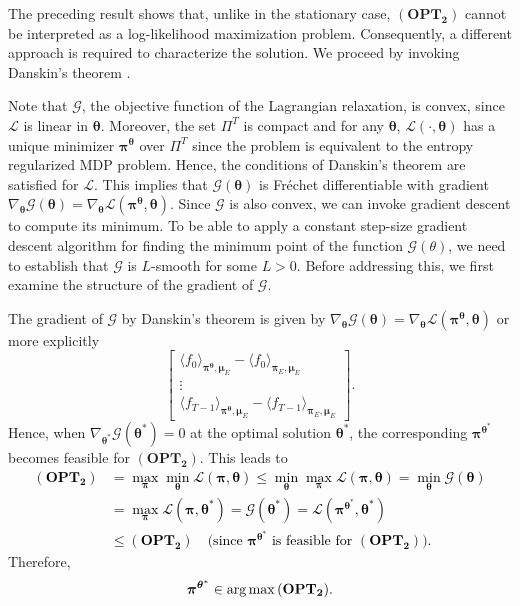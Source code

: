\documentclass[11pt]{article}
\newcommand{\argmax}{\mathop{\rm arg\, max}}
\newcommand{\bmu}{{\boldsymbol \mu}}
\newcommand{\bpi}{{\boldsymbol \pi}}
\newcommand{\btheta}{{\boldsymbol \theta}}
\newcommand{\cL}{{\mathcal L}}
\newcommand{\cG}{{\mathcal G}}
\newcommand{\lk}[1]{\textcolor{black}{#1}} %
\begin{document}
The preceding result shows that, unlike in the stationary case, $\mathbf{(OPT_2)}$ cannot be interpreted as a log-likelihood maximization problem. Consequently, a different approach is required to characterize the solution. We proceed by invoking Danskin's theorem \cite[Proposition B.25]{Ber99}.




Note that $\cG$, the objective function of the Lagrangian relaxation, is convex, since $\cL$ is linear in $\btheta$. Moreover, the set $\Pi^T$ is compact and for any $\btheta$, $\cL(\cdot,\btheta)$ has a unique minimizer $\bpi^{\btheta}$ over $\Pi^T$ since the problem is equivalent to the entropy regularized MDP problem. Hence,  the conditions of Danskin's theorem \cite[Proposition B.25]{Ber99}  are satisfied for $\cL$. This implies that $\cG(\btheta)$ is Fr\'echet differentiable with gradient $\nabla_{\btheta} \cG(\btheta) = \nabla_{\btheta} \cL(\bpi^{\btheta},\btheta)$. Since $\cG$ is also convex, we can invoke gradient descent to compute its minimum.
To be able to apply a constant step-size gradient descent algorithm for finding the minimum point of the function $\cG(\theta)$, we need to establish that $\cG$ is $L$-smooth for some $L>0$. Before addressing this, we first examine the structure of the gradient of $\cG$.

The gradient of $\cG$ by Danskin's theorem is given by $\nabla_{\btheta} \cG(\btheta) = \nabla_{\btheta} \cL(\bpi^{\btheta},\btheta)$ or more explicitly
$$
\begin{bmatrix} \langle f_0 \rangle_{\bpi^{\btheta},\bmu_E} - \langle f_0 \rangle_{\bpi_E,\bmu_E} \\ \vdots \\ \langle f_{T-1} \rangle_{\bpi^{\btheta},\bmu_E} - \langle f_{T-1} \rangle_{\bpi_E,\bmu_E} \end{bmatrix}.
$$
Hence, when $\nabla_{\btheta^*} \cG(\btheta^*) = 0$ at the optimal solution $\btheta^*$, the corresponding $\bpi^{\btheta^*}$ becomes feasible for ${\mathbf{(OPT_2)}}$. This leads to
\lk{\begin{align*}
\mathbf{(OPT_2)} &= \max_{\bpi} \min_{\btheta} \cL(\bpi,\btheta) 
\leq \min_{\btheta} \max_{\bpi} \cL(\bpi,\btheta) = \min_{\btheta} \cG(\btheta) \\
&= \max_{\bpi} \cL(\bpi,\btheta^*) = \cG(\btheta^*) = \cL(\bpi^{\btheta^*}, \btheta^*) \\
&\leq \mathbf{(OPT_2)} \quad \text{(since $\bpi^{\btheta^*}$ is feasible for $\mathbf{(OPT_2)}$).}
\end{align*}}
Therefore, 
\begin{align*}
\bpi^{\btheta^*} \in \argmax  \mathbf{(OPT_2)}.
\end{align*}
\end{document}
